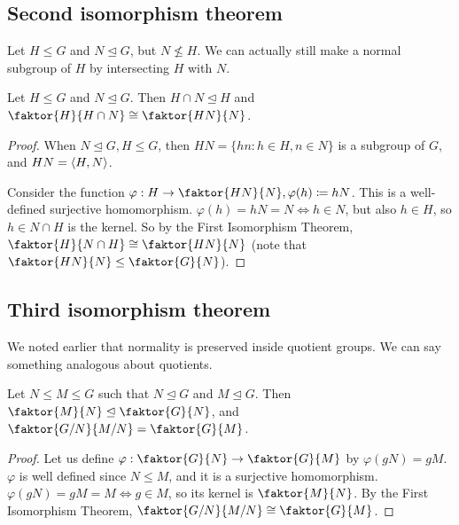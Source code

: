 \subsection{Second isomorphism theorem}
Let \(H\leq G\) and \(N\trianglelefteq G\), but \(N \nleq H\).
We can actually still make a normal subgroup of \(H\) by intersecting \(H\) with \(N\).
\begin{theorem}
	Let \(H \leq G\) and \(N \trianglelefteq G\).
	Then \(H \cap N \trianglelefteq H\) and \(\faktor{H}{H \cap N} \cong \faktor{HN}{N}\).
\end{theorem}
\begin{proof}
	When \(N \trianglelefteq G, H \leq G\), then \(HN = \{ hn: h \in H, n \in N \}\) is a subgroup of \(G\), and \(HN = \left\langle{} H, N \right\rangle\).

	Consider the function \(\varphi: H \to \faktor{HN}{N}, \varphi(h) \coloneq hN\).
	This is a well-defined surjective homomorphism.
	\(\varphi(h) = hN = N \iff h \in N\), but also \(h \in H\), so \(h \in N \cap H\) is the kernel.
	So by the First Isomorphism Theorem, \(\faktor{H}{N \cap H} \cong \faktor{HN}{N}\) (note that \(\faktor{HN}{N} \leq \faktor{G}{N}\)).
\end{proof}

\subsection{Third isomorphism theorem}
We noted earlier that normality is preserved inside quotient groups.
We can say something analogous about quotients.
\begin{theorem}
	Let \(N \leq M \leq G\) such that \(N \trianglelefteq G\) and \(M \trianglelefteq G\).
	Then \(\faktor{M}{N} \trianglelefteq \faktor{G}{N}\), and \(\faktor{G/N}{M/N} = \faktor{G}{M}\).
\end{theorem}
\begin{proof}
	Let us define \(\varphi: \faktor{G}{N} \to \faktor{G}{M}\) by \(\varphi(gN) = gM\).
	\(\varphi\) is well defined since \(N \leq M\), and it is a surjective homomorphism.
	\(\varphi(gN) = gM = M \iff g \in M\), so its kernel is \(\faktor{M}{N}\).
	By the First Isomorphism Theorem, \(\faktor{G/N}{M/N} \cong \faktor{G}{M}\).
\end{proof}

